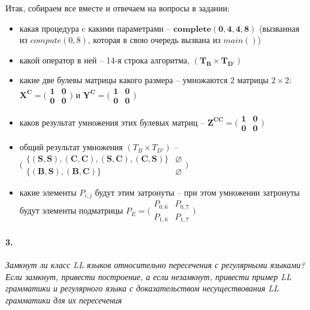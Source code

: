 \documentclass[russian,table]{article}
\begin{document}
Итак, собираем все вместе и отвечаем на вопросы в задании:

\begin{itemize}
\item какая процедура c какими параметрами -- $\mathbf{complete(0, 4, 4, 8)}$ (вызванная из $compute(0, 8)$, которая в свою очередь вызвана из $main()$)
\item какой оператор в ней -- 14-я строка алгоритма, $\mathbf{(T_B \times T_{D'})}$
\item какие две булевы матрицы какого размера -- умножаются 2 матрицы $2 \times 2$: $\mathbf{X^C = \bigl(\begin{smallmatrix} 1&0\\0&0 \end{smallmatrix} \bigr)}$ и $\mathbf{Y^C = \bigl(\begin{smallmatrix} 1&0\\0&0 \end{smallmatrix} \bigr)}$
\item каков результат умножения этих булевых матриц -- $\mathbf{Z^{CC} = \bigl(\begin{smallmatrix} 1&0\\0&0 \end{smallmatrix} \bigr)}$
\item общий результат умножения $(T_B \times T_{D'})$ -- $\mathbf{\bigl(\begin{smallmatrix} \{(S, S), (C, C), (S, C), (C, S)\} & \varnothing  \\ \{(B, S), (B, C)\} & \varnothing \end{smallmatrix} \bigr)}$
\item какие элементы $P_{i,j}$ будут этим затронуты -- при этом умножении затронуты будут элементы подматрицы $P_E = \bigl(\begin{smallmatrix} P_{0, 6} & P_{0, 7} \\ P_{1, 6} &P_{1, 7} \end{smallmatrix} \bigr)$
\end{itemize}

\pagebreak

\paragraph*{3.}

\textit{Замкнут ли класс LL языков относительно пересечения с регулярными языками? Если замкнут, привести построение, а если незамкнут, привести пример LL грамматики и регулярного языка с доказательством несуществования LL грамматики для их пересечения}
\end{document}
